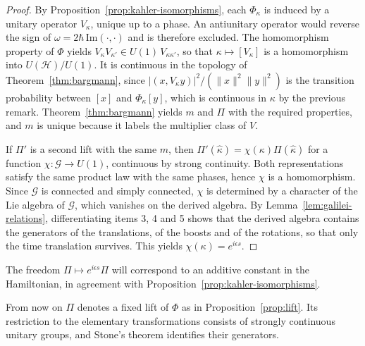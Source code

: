 \begin{proof}
	By Proposition~\ref{prop:kahler-isomorphisms}, each $\Phi_\kappa$ is induced by a unitary operator $V_\kappa$, unique up to a phase. An antiunitary operator would reverse the sign of $\omega=2\hbar\,\mathrm{Im}(\cdot,\cdot)$ and is therefore excluded. The homomorphism property of $\Phi$ yields $V_\kappa V_{\kappa'}\in U(1)\,V_{\kappa\kappa'}$, so that $\kappa\mapsto[V_\kappa]$ is a homomorphism into $U(\mathcal{H})/U(1)$. It is continuous in the topology of Theorem~\ref{thm:bargmann}, since $|(x,V_\kappa y)|^2/(\|x\|^2\|y\|^2)$ is the transition probability between $[x]$ and $\Phi_\kappa[y]$, which is continuous in $\kappa$ by the previous remark. Theorem~\ref{thm:bargmann} yields $m$ and $\Pi$ with the required properties, and $m$ is unique because it labels the multiplier class of $V$.
	
	If $\Pi'$ is a second lift with the same $m$, then $\Pi'(\hat\kappa)=\chi(\kappa)\Pi(\hat\kappa)$ for a function $\chi:\mathcal{G}\to U(1)$, continuous by strong continuity. Both representations satisfy the same product law with the same phases, hence $\chi$ is a homomorphism. Since $\mathcal{G}$ is connected and simply connected, $\chi$ is determined by a character of the Lie algebra of $\mathcal{G}$, which vanishes on the derived algebra. By Lemma~\ref{lem:galilei-relations}, differentiating items 3, 4 and 5 shows that the derived algebra contains the generators of the translations, of the boosts and of the rotations, so that only the time translation survives. This yields $\chi(\kappa)=e^{i\epsilon s}$.
\end{proof}

\noindent The freedom $\Pi\mapsto e^{i\epsilon s}\Pi$ will correspond to an additive constant in the Hamiltonian, in agreement with Proposition~\ref{prop:kahler-isomorphisms}.

From now on $\Pi$ denotes a fixed lift of $\Phi$ as in Proposition~\ref{prop:lift}. Its restriction to the elementary transformations consists of strongly continuous unitary groups, and Stone's theorem identifies their generators.

